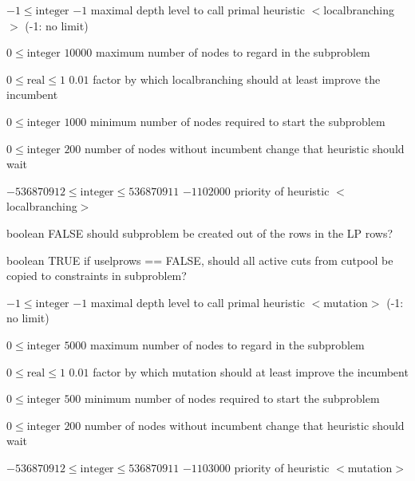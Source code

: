 %
{$-1\leq\textrm{integer}$}%
{$-1$}%
{maximal depth level to call primal heuristic $<$localbranching$>$ (-1: no limit)}%
{}

%
{$0\leq\textrm{integer}$}%
{$10000$}%
{maximum number of nodes to regard in the subproblem}%
{}

%
{$0\leq\textrm{real}\leq1$}%
{$0.01$}%
{factor by which localbranching should at least improve the incumbent}%
{}

%
{$0\leq\textrm{integer}$}%
{$1000$}%
{minimum number of nodes required to start the subproblem}%
{}

%
{$0\leq\textrm{integer}$}%
{$200$}%
{number of nodes without incumbent change that heuristic should wait}%
{}

%
{$-536870912\leq\textrm{integer}\leq536870911$}%
{$-1102000$}%
{priority of heuristic $<$localbranching$>$}%
{}

%
{boolean}%
{FALSE}%
{should subproblem be created out of the rows in the LP rows?}%
{}

%
{boolean}%
{TRUE}%
{if uselprows == FALSE, should all active cuts from cutpool be copied to constraints in subproblem?}%
{}

%
{$-1\leq\textrm{integer}$}%
{$-1$}%
{maximal depth level to call primal heuristic $<$mutation$>$ (-1: no limit)}%
{}

%
{$0\leq\textrm{integer}$}%
{$5000$}%
{maximum number of nodes to regard in the subproblem}%
{}

%
{$0\leq\textrm{real}\leq1$}%
{$0.01$}%
{factor by which mutation should at least improve the incumbent}%
{}

%
{$0\leq\textrm{integer}$}%
{$500$}%
{minimum number of nodes required to start the subproblem}%
{}

%
{$0\leq\textrm{integer}$}%
{$200$}%
{number of nodes without incumbent change that heuristic should wait}%
{}

%
{$-536870912\leq\textrm{integer}\leq536870911$}%
{$-1103000$}%
{priority of heuristic $<$mutation$>$}%
{}

